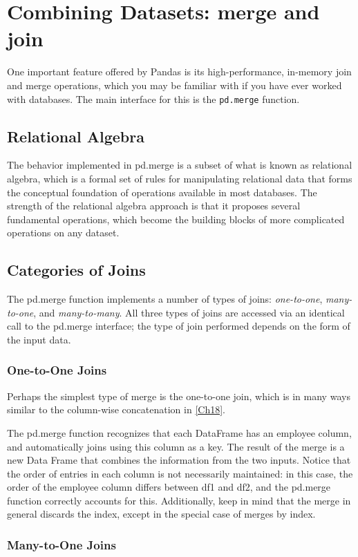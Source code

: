 \chapter{Combining Datasets: merge and join\label{Ch19}}
One important feature offered by Pandas is its high-performance, in-memory join
and merge operations, which you may be familiar with if you have ever worked with
databases. The main interface for this is the \verb|pd.merge| function.
\section{Relational Algebra}
The behavior implemented in pd.merge is a subset of what is known as relational
algebra, which is a formal set of rules for manipulating relational data that forms the
conceptual foundation of operations available in most databases. The strength of the relational algebra approach is that it proposes several fundamental operations, which
become the building blocks of more complicated operations on any dataset.

\section{Categories of Joins}
The pd.merge function implements a number of types of joins: \emph{one-to-one}, \emph{many-to-one}, and \emph{many-to-many}. All three types of joins are accessed via an identical call to
the pd.merge interface; the type of join performed depends on the form of the input
data.

\subsection*{One-to-One Joins}
Perhaps the simplest type of merge is the one-to-one join, which is in many ways similar to the column-wise concatenation in \autoref{Ch18}.


The pd.merge function recognizes that each DataFrame has an employee column, and
automatically joins using this column as a key. The result of the merge is a new Data
Frame that combines the information from the two inputs. Notice that the order of
entries in each column is not necessarily maintained: in this case, the order of the
employee column differs between df1 and df2, and the pd.merge function correctly
accounts for this. Additionally, keep in mind that the merge in general discards the
index, except in the special case of merges by index.

\subsection*{Many-to-One Joins}

